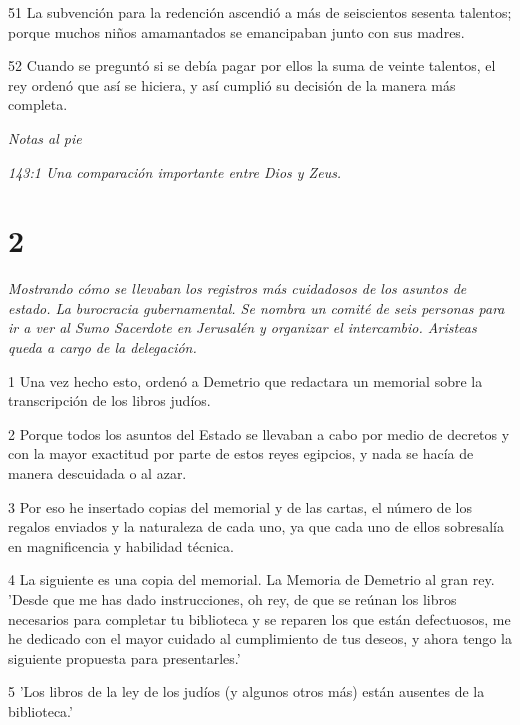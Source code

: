 \par 51 La subvención para la redención ascendió a más de seiscientos sesenta talentos; porque muchos niños amamantados se emancipaban junto con sus madres.

\par 52 Cuando se preguntó si se debía pagar por ellos la suma de veinte talentos, el rey ordenó que así se hiciera, y así cumplió su decisión de la manera más completa.

\par \textit{Notas al pie}
\par \textit{143:1 Una comparación importante entre Dios y Zeus.}

\chapter{2}

\par \textit{Mostrando cómo se llevaban los registros más cuidadosos de los asuntos de estado. La burocracia gubernamental. Se nombra un comité de seis personas para ir a ver al Sumo Sacerdote en Jerusalén y organizar el intercambio. Aristeas queda a cargo de la delegación.}

\par 1 Una vez hecho esto, ordenó a Demetrio que redactara un memorial sobre la transcripción de los libros judíos.

\par 2 Porque todos los asuntos del Estado se llevaban a cabo por medio de decretos y con la mayor exactitud por parte de estos reyes egipcios, y nada se hacía de manera descuidada o al azar.

\par 3 Por eso he insertado copias del memorial y de las cartas, el número de los regalos enviados y la naturaleza de cada uno, ya que cada uno de ellos sobresalía en magnificencia y habilidad técnica.

\par 4 La siguiente es una copia del memorial. La Memoria de Demetrio al gran rey. 'Desde que me has dado instrucciones, oh rey, de que se reúnan los libros necesarios para completar tu biblioteca y se reparen los que están defectuosos, me he dedicado con el mayor cuidado al cumplimiento de tus deseos, y ahora tengo la siguiente propuesta para presentarles.'

\par 5 'Los libros de la ley de los judíos (y algunos otros más) están ausentes de la biblioteca.'

